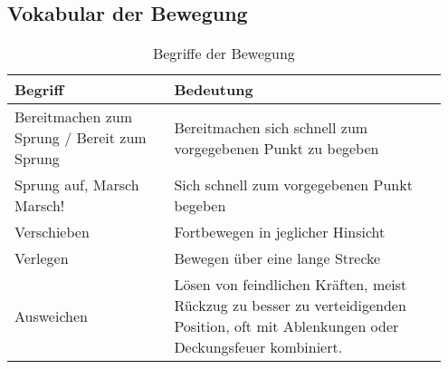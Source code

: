 \subsection{Vokabular der Bewegung}
	\begin{longtable}{|p{0.35\linewidth} | p{0.6\linewidth} |}
		\caption[Vokabular Bewegung]{Begriffe der Bewegung} \\
		\hline
		\textbf{Begriff} & \textbf{Bedeutung} \\
		\hline
		Bereitmachen zum Sprung / Bereit zum Sprung & Bereitmachen sich schnell zum vorgegebenen Punkt zu begeben\\
		\hline
		Sprung auf, Marsch Marsch! & Sich schnell zum vorgegebenen Punkt begeben\\
		\hline
		Verschieben & Fortbewegen in jeglicher Hinsicht\\
		\hline
		Verlegen & Bewegen über eine lange Strecke \\
		\hline
		Ausweichen & Lösen von feindlichen Kräften, meist Rückzug zu besser zu verteidigenden Position, oft mit Ablenkungen oder Deckungsfeuer kombiniert.\\
		\hline
	\end{longtable}